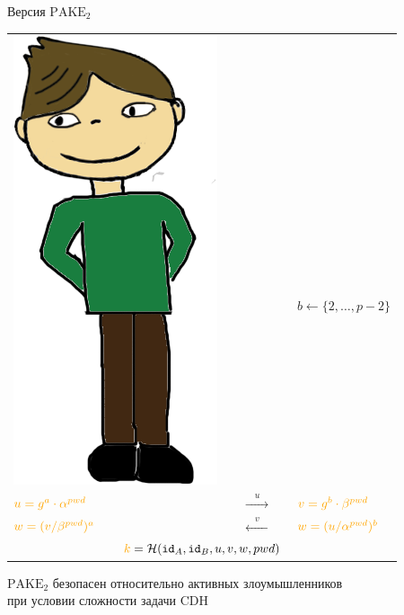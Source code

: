 \documentclass[usenames,dvipsnames,8pt,aspectratio=169]{beamer}
\begin{document}
\begin{frame}{ Версия $\text{PAKE}_2$}
\begin{center}
\begin{center}
\begin{tabular}{l c c c l}
\multirow{2}{*}{\includegraphics[scale=0.15]{Bob}} &    \\[10pt]
$ a \leftarrow \{2, \ldots, p-2 \}$ & & &  &\hspace{-30pt} $b \leftarrow \{2, \ldots, p-2 \}$ \\[3pt]
\huge ${\color{Orange} u = g^a \cdot \alpha^{pwd}} $ & & {\Huge $\xrightarrow{\quad u \quad }$}& & \hspace{-30pt}  \huge ${\color{Orange} v = g^b \cdot \beta^{pwd}} $ \\[3pt]
\huge $ {\color{Orange}w = (v/\beta^{pwd})^a}$& &  {\Huge $\xleftarrow{\quad v \quad }$}&  & \huge \hspace{-30pt} ${\color{Orange}w = (u/\alpha^{pwd})^b}$ \\[17pt]
\multicolumn{5}{c}{ \LARGE ${\color{Orange}k} =\Hash(\mathtt{id}_{A}, \mathtt{id}_{B}, u, v, w, pwd) $}   \\
\end{tabular}
\end{center}
%
\end{center}

\vspace{20pt}

$\text{PAKE}_2$ безопасен относительно {\color{Orange} активных} злоумышленников \\ при условии сложности задачи CDH \\


\end{frame}
\end{document}
